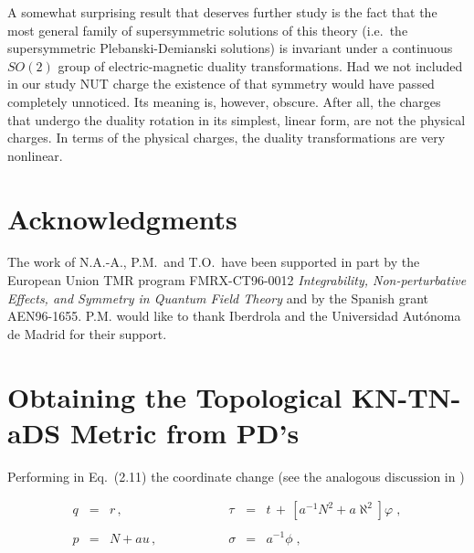 \documentclass[12pt,a4paper]{article}
\begin{document}
A somewhat surprising result that deserves further study is the fact
that the most general family of supersymmetric solutions of this
theory (i.e.~the supersymmetric Plebanski-Demianski solutions) is
invariant under a continuous $SO(2)$ group of electric-magnetic
duality transformations. Had we not included in our study NUT charge
the existence of that symmetry would have passed completely unnoticed.
Its meaning is, however, obscure. After all, the charges that undergo
the duality rotation in its simplest, linear form, are not the
physical charges. In terms of the physical charges, the duality
transformations are very nonlinear.



\section*{Acknowledgments}

The work of N.A.-A., P.M.~and T.O.~have been supported in part by
the European Union TMR program FMRX-CT96-0012 {\sl Integrability,
  Non-perturbative Effects, and Symmetry in Quantum Field Theory} and
by the Spanish grant AEN96-1655. P.M. would like to thank Iberdrola
and the Universidad Aut\'onoma de Madrid for their support.

\appendix

\section{Obtaining the Topological KN-TN-aDS Metric from PD's}
\label{sec-KNTNADSfromPD}

Performing in Eq.~(2.11) the coordinate
change (see the analogous discussion in \cite{art:KMV})

\begin{equation}
\begin{array}{rclrcl}
q       & = & r\, ,                                                   & 
\tau    & = & t\,+\, \left[ a^{-1}N^{2}+a\aleph^{2}\right]\varphi \; ,\\
& & & & & \\
p       & = & N+au\, ,\hspace{2cm}                                    &
\sigma  & = & a^{-1}\phi \; ,                                         \\
\end{array}
\end{equation}
\end{document}
